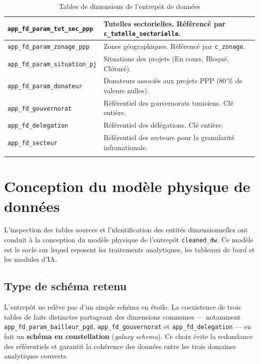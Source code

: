 \begin{longtable}{|p{5.5cm}|p{9cm}|}
\hline
\texttt{app\_fd\_param\_tut\_sec\_ppp} &
Tutelles sectorielles. Référencé par \texttt{c\_tutelle\_sectorielle}. \\
\hline
\texttt{app\_fd\_param\_zonage\_ppp} &
Zones géographiques. Référencé par \texttt{c\_zonage}. \\
\hline
\texttt{app\_fd\_param\_situation\_pj} &
Situations des projets (En cours, Bloqué, Clôturé). \\
\hline
\texttt{app\_fd\_param\_donateur} &
Donateurs associés aux projets PPP (80\,\% de valeurs nulles). \\
\hline
\texttt{app\_fd\_gouvernorat} &
Référentiel des gouvernorats tunisiens. Clé entière. \\
\hline
\texttt{app\_fd\_delegation} &
Référentiel des délégations. Clé entière. \\
\hline
\texttt{app\_fd\_secteur} &
Référentiel des secteurs pour la granularité infranationale. \\
\hline

\captionsetup{justification=centering,margin=2cm}
\caption{Tables de dimensions de l'entrepôt de données}
\label{tab:tables_dimensions}
\end{longtable}

\section{Conception du modèle physique de données}

L'inspection des tables sources et l'identification des entités
dimensionnelles ont conduit à la conception du modèle physique de
l'entrepôt \texttt{cleaned\_dw}. Ce modèle est le socle sur lequel
reposent les traitements analytiques, les tableaux de bord et les
modules d'IA.

\subsection{Type de schéma retenu}

L'entrepôt ne relève pas d'un simple schéma en étoile. La
coexistence de trois tables de faits distinctes partageant des
dimensions communes — notamment \texttt{app\_fd\_param\_bailleur\_pgd},
\texttt{app\_fd\_gouvernorat} et \texttt{app\_fd\_delegation} —
en fait un \textbf{schéma en constellation} (\textit{galaxy schema}).
Ce choix évite la redondance des référentiels et garantit la
cohérence des données entre les trois domaines analytiques couverts.

